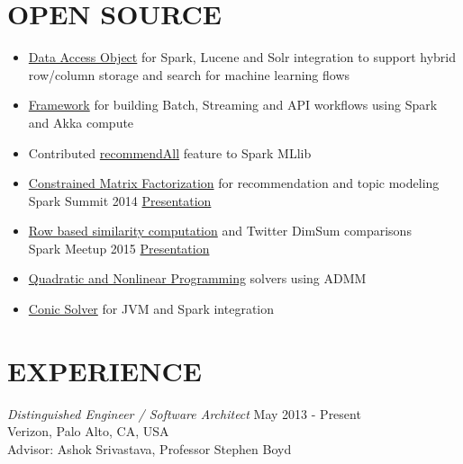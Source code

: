 \documentclass[margin]{res}
\begin{document}
\begin{resume}
\section{OPEN SOURCE}
\begin{itemize} \itemsep -2pt
\item \href{https://github.com/Verizon/trapezium/tree/master/dal} {Data Access Object} for
  Spark, Lucene and Solr integration to support hybrid row/column storage and
  search for machine learning flows

\item \href{https://github.com/Verizon/trapezium/tree/master/framework}
  {Framework} for building Batch, Streaming and API workflows using Spark and Akka compute

\item Contributed \href{https://issues.apache.org/jira/browse/SPARK-3066} {recommendAll} feature to Spark MLlib

\item \href {https://issues.apache.org/jira/browse/SPARK-2426} {Constrained
  Matrix Factorization} for recommendation and topic modeling\\
Spark Summit 2014 \href {http://debasish83.github.io/quadprog/SparkSummit072014.html} {Presentation}

\item \href{https://issues.apache.org/jira/browse/SPARK-4823} {Row based similarity computation} and Twitter DimSum comparisons\\
Spark Meetup 2015 \href{http://debasish83.github.io/spark-meetup-july2015/mf-slides.pdf} {Presentation}

\item \href{https://github.com/scalanlp/breeze/tree/master/math/src/main/scala/breeze/optimize}{Quadratic
and Nonlinear Programming} solvers using ADMM

\item \href{https://github.com/embotech/ecos-java-scala} {Conic Solver} for JVM and Spark integration
\end{itemize}

\section{EXPERIENCE}

{\sl Distinguished Engineer / Software Architect} \hfill May 2013 - Present\\
Verizon, Palo Alto, CA, USA\\
Advisor: Ashok Srivastava, Professor Stephen Boyd
\begin{itemize} \itemsep -2pt


\end{itemize}
\end{resume}
\end{document}
